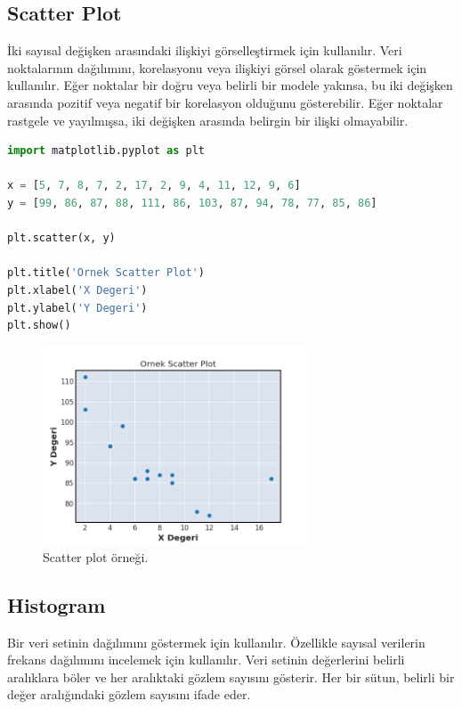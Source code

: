 \newpage

\subsection{Scatter Plot}
İki sayısal değişken arasındaki ilişkiyi görselleştirmek için kullanılır. Veri noktalarının dağılımını, korelasyonu veya ilişkiyi görsel olarak göstermek için kullanılır. Eğer noktalar bir doğru veya belirli bir modele yakınsa, bu iki değişken arasında pozitif veya negatif bir korelasyon olduğunu gösterebilir. Eğer noktalar rastgele ve yayılmışsa, iki değişken arasında belirgin bir ilişki olmayabilir.

\begin{lstlisting}[language=Python]
import matplotlib.pyplot as plt

x = [5, 7, 8, 7, 2, 17, 2, 9, 4, 11, 12, 9, 6]
y = [99, 86, 87, 88, 111, 86, 103, 87, 94, 78, 77, 85, 86]

plt.scatter(x, y)

plt.title('Ornek Scatter Plot')
plt.xlabel('X Degeri')
plt.ylabel('Y Degeri')
plt.show()
\end{lstlisting}

\begin{figure}[h]
    \centering
    \includegraphics[width=0.7\textwidth]{images/scatter_plot.png}
    \caption{Scatter plot örneği.}
    \label{fig:enter-label}
\end{figure}

\newpage

\subsection{Histogram}
Bir veri setinin dağılımını göstermek için kullanılır. Özellikle sayısal verilerin frekans dağılımını incelemek için kullanılır. Veri setinin değerlerini belirli aralıklara böler ve her aralıktaki gözlem sayısını gösterir. Her bir sütun, belirli bir değer aralığındaki gözlem sayısını ifade eder.

